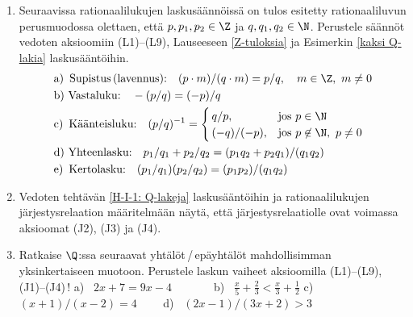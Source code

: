 \begin{enumerate}
\item  \label{H-I-1: Q-lakeja}
Seuraavissa rationaalilukujen laskusäännöissä on tulos esitetty rationaaliluvun perusmuodossa
olettaen, että $p,p_1,p_2\in\Z$ ja $q,q_1,q_2\in\N$. Perustele säännöt vedoten aksioomiin (L1)--(L9),
Lauseeseen \ref{Z-tuloksia} ja Esimerkin \ref{kaksi Q-lakia} laskusääntöihin.
\begin{align*}
&\text{a) \,Supistus\,(lavennus):} \quad (p \cdot m)/(q \cdot m) = p/q, \quad m\in\Z,\ m\neq 0 \\
&\text{b)   Vastaluku:} \quad -(p/q) = (-p)/q \\
&\text{c) \,Käänteisluku:} \quad (p/q)^{-1} = \begin{cases}
                                              \,q/p,       &\text{jos}\ p\in\N \\
                                              \,(-q)/(-p), &\text{jos}\ p\not\in\N,\ p \neq 0
                                              \end{cases} \\
&\text{d)   Yhteenlasku:} \quad p_1/q_1+p_2/q_2 = (p_1q_2+p_2q_1)/(q_1q_2) \\
&\text{e) \,Kertolasku:} \quad (p_1/q_1)(p_2/q_2) = (p_1p_2)/(q_1q_2)
\end{align*}

\item \label{H-I-1: Q-järjestys}
Vedoten tehtävän \ref{H-I-1: Q-lakeja} laskusääntöihin ja rationaalilukujen järjestysrelaation
määritelmään näytä, että järjestysrelaatiolle ovat voimassa aksioomat (J2), (J3) ja (J4). 

\item
Ratkaise $\Q$:ssa seuraavat yhtälöt\,/\,epäyhtälöt mahdollisimman yksinkertaiseen muotoon. 
Perustele laskun vaiheet aksioomilla (L1)--(L9), (J1)--(J4)\,! \vspace{1mm}\newline
a) \ $2x+7=9x-4 \qquad\quad\,\ $
b) \ $\tfrac{x}{5}+\tfrac{2}{3}<\tfrac{x}{3}+\tfrac{1}{2}$ \newline
c) \ $(x+1)/(x-2)=4 \qquad$
d) \ $(2x-1)/(3x+2)>3$


\end{enumerate}
